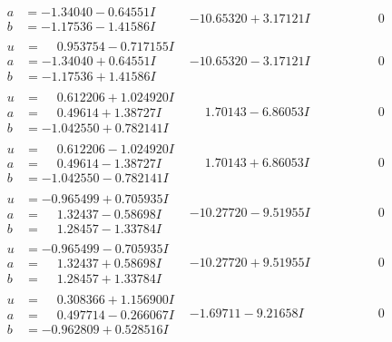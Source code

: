 \documentclass[1p]{elsarticle_modified}
\theoremstyle{definition}
\begin{document}
$$\begin{array}{c|c|c}
\begin{aligned}
a &= -1.34040 - 0.64551 I \\
b &= -1.17536 - 1.41586 I\end{aligned}
 & -10.65320 + 3.17121 I & \phantom{-0.000000 } 0 \\ \hline\begin{aligned}
u &= \phantom{-}0.953754 - 0.717155 I \\
a &= -1.34040 + 0.64551 I \\
b &= -1.17536 + 1.41586 I\end{aligned}
 & -10.65320 - 3.17121 I & \phantom{-0.000000 } 0 \\ \hline\begin{aligned}
u &= \phantom{-}0.612206 + 1.024920 I \\
a &= \phantom{-}0.49614 + 1.38727 I \\
b &= -1.042550 + 0.782141 I\end{aligned}
 & \phantom{-}1.70143 - 6.86053 I & \phantom{-0.000000 } 0 \\ \hline\begin{aligned}
u &= \phantom{-}0.612206 - 1.024920 I \\
a &= \phantom{-}0.49614 - 1.38727 I \\
b &= -1.042550 - 0.782141 I\end{aligned}
 & \phantom{-}1.70143 + 6.86053 I & \phantom{-0.000000 } 0 \\ \hline\begin{aligned}
u &= -0.965499 + 0.705935 I \\
a &= \phantom{-}1.32437 - 0.58698 I \\
b &= \phantom{-}1.28457 - 1.33784 I\end{aligned}
 & -10.27720 - 9.51955 I & \phantom{-0.000000 } 0 \\ \hline\begin{aligned}
u &= -0.965499 - 0.705935 I \\
a &= \phantom{-}1.32437 + 0.58698 I \\
b &= \phantom{-}1.28457 + 1.33784 I\end{aligned}
 & -10.27720 + 9.51955 I & \phantom{-0.000000 } 0 \\ \hline\begin{aligned}
u &= \phantom{-}0.308366 + 1.156900 I \\
a &= \phantom{-}0.497714 - 0.266067 I \\
b &= -0.962809 + 0.528516 I\end{aligned}
 & -1.69711 - 9.21658 I & \phantom{-0.000000 } 0 \\ \hline\begin{aligned}

\end{aligned}
\end{array}$$
\end{document}
